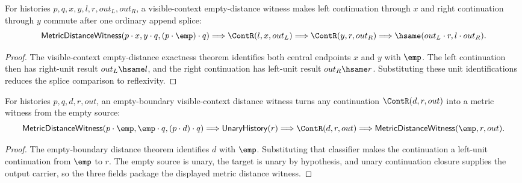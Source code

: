 \begin{theorem}
\label{thm:metric-distance-witness-visible-context-empty-distance-unit-splice-commute}
For histories $p,q,x,y,l,r,out_L,out_R$, a visible-context empty-distance
witness makes left continuation through $x$ and right continuation through $y$
commute after one ordinary append splice:
$$
\mathsf{MetricDistanceWitness}(p\cdot x,y\cdot q,(p\cdot\emp)\cdot q)
\Longrightarrow
\ContR(l,x,out_L)\Longrightarrow
\ContR(y,r,out_R)\Longrightarrow
\hsame(out_L\cdot r,l\cdot out_R).
$$
\end{theorem}
\begin{proof}
The visible-context empty-distance exactness theorem identifies both central
endpoints $x$ and $y$ with $\emp$. The left continuation then has right-unit
result $out_L\hsame l$, and the right continuation has left-unit result
$out_R\hsame r$. Substituting these unit identifications reduces the splice
comparison to reflexivity.
\end{proof}

\begin{theorem}
\label{thm:metric-distance-witness-empty-boundary-visible-context-left-unit-witness}
For histories $p,q,d,r,out$, an empty-boundary visible-context distance witness
turns any continuation $\ContR(d,r,out)$ into a metric witness from the empty
source:
$$
\mathsf{MetricDistanceWitness}(p\cdot\emp,\emp\cdot q,(p\cdot d)\cdot q)
\Longrightarrow
\mathsf{UnaryHistory}(r)\Longrightarrow
\ContR(d,r,out)\Longrightarrow
\mathsf{MetricDistanceWitness}(\emp,r,out).
$$
\end{theorem}
\begin{proof}
The empty-boundary distance theorem identifies $d$ with $\emp$. Substituting
that classifier makes the continuation a left-unit continuation from $\emp$ to
$r$. The empty source is unary, the target is unary by hypothesis, and unary
continuation closure supplies the output carrier, so the three fields package
the displayed metric distance witness.
\end{proof}

